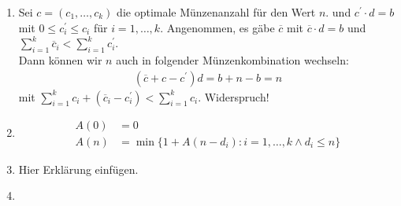 

\begin{solution}

\phantom{}

\begin{enumerate}[label = \alph*)]

\item Sei $c = (c_1,\dots,c_k)$ die optimale Münzenanzahl für den Wert $n$.
und $c^{\prime}\cdot d = b$ mit $0 \leq c^{\prime}_i \leq c_i$ für $i=1,\dots,k$.
Angenommen, es gäbe $\overline{c}$ mit $\overline{c}\cdot d = b$ und
$\sum_{i=1}^k \overline{c}_i < \sum_{i=1}^k c^{\prime}_i$. \\
Dann können wir $n$ auch in folgender Münzenkombination wechseln:
\begin{align*}
  (\overline{c} + c - c^{\prime})d = b + n - b = n
\end{align*}
mit $\sum_{i=1}^k c_i + (\overline{c}_i - c^{\prime}_i) < \sum_{i=1}^k c_i$. Widerspruch!

\item
\begin{align*}
  A(0) &= 0 \\
  A(n) &= \min\{ 1 + A(n - d_i): i = 1,\dots,k \land d_i \leq n\}
\end{align*}

\item Hier Erklärung einfügen.

\item
\end{enumerate}

\end{solution}

